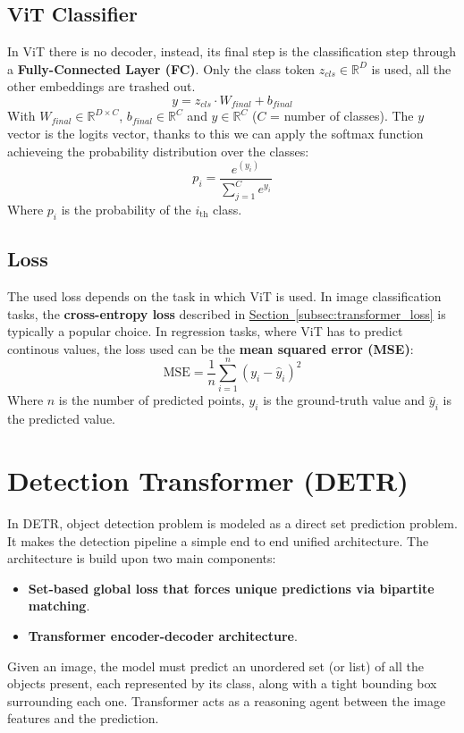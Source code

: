 \documentclass[12pt]{article}
\begin{document}
\subsection{ViT Classifier}
In ViT there is no decoder, instead, its final step is the classification step through a \textbf{Fully-Connected 
Layer (FC)}. Only the class token $z_{cls} \in \mathbb{R}^D$ is used, all the other embeddings are trashed out. 
\begin{equation}
    y = z_{cls} \cdot W_{final} + b_{final}
\end{equation}
With $W_{final} \in \mathbb{R}^{D \times C}$, $b_{final} \in \mathbb{R}^C$ and 
$y\in \mathbb{R}^C$ ($C$ = number of classes). The $y$ vector is the logits vector, thanks to this we can apply the 
softmax function achieveing the probability distribution over the classes:
\begin{equation}
    p_i = \dfrac{e^{(y_i)}}{\sum_{j=1}^{C} e^{y_i}}
\end{equation}
Where $p_i$ is the probability of the $i_{\text{th}}$ class.

\subsection{Loss}
The used loss depends on the task in which ViT is used. In image classification tasks, the \textbf{cross-entropy 
loss} described in \hyperref[subsec:transformer_loss]{Section~\ref*{subsec:transformer_loss}} is typically 
a popular choice. In regression tasks, where ViT has to predict continous values, the loss used can be the 
\textbf{mean squared error (MSE)}:
\begin{equation}
    \text{MSE} = \dfrac{1}{n} \sum_{i=1}^{n} (y_i - \hat{y}_i)^2
\end{equation}
Where $n$ is the number of predicted points, $y_i$ is the ground-truth value and $\hat{y}_i$ is the predicted 
value.




\section{Detection Transformer (DETR)}
In DETR, object detection problem is modeled as a direct set prediction problem. It makes the detection pipeline a 
simple end to end unified architecture. The architecture is build upon two main components:
\begin{itemize}
    \item \textbf{Set-based global loss that forces unique predictions via bipartite matching}.
    \item \textbf{Transformer encoder-decoder architecture}.
\end{itemize}
Given an image, the model must predict an unordered set (or list) of all the objects present, each 
represented by its class, along with a tight bounding box surrounding each one. Transformer acts as a 
reasoning agent between the image features and the prediction.
\end{document}
